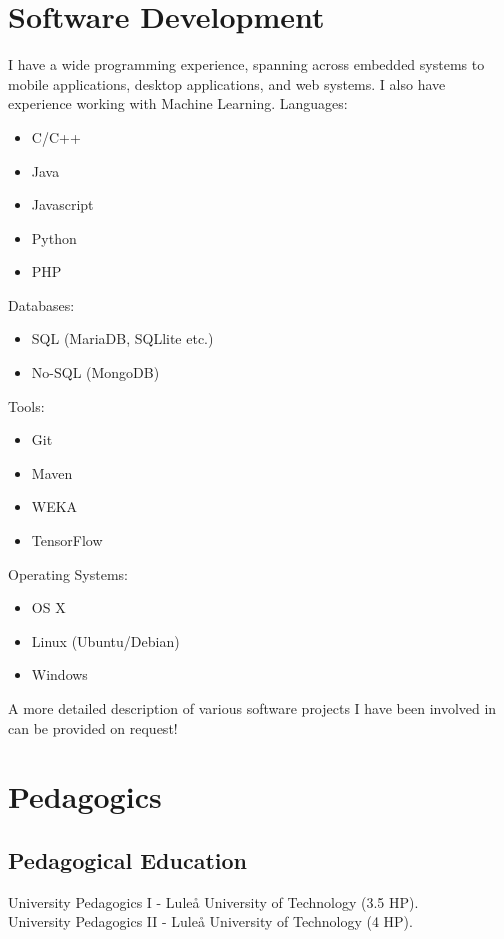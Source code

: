 \documentclass{article}
\begin{document}
\section{Software Development}
I have a wide programming experience, spanning across embedded systems to mobile applications, desktop applications, and web systems. I also have experience working with Machine Learning.
\newline
\newline
Languages:
\begin{itemize}
    \item C/C++
    \item Java
    \item Javascript
    \item Python
    \item PHP
\end{itemize}
\newline
Databases:
\begin{itemize}
    \item SQL (MariaDB, SQLlite etc.)
    \item No-SQL (MongoDB)
\end{itemize}
\newline
Tools:
\begin{itemize}
    \item Git
    \item Maven
    \item WEKA
    \item TensorFlow
\end{itemize}
\newline
Operating Systems:
\begin{itemize}
    \item OS X
    \item Linux (Ubuntu/Debian)
    \item Windows
\end{itemize}

A more detailed description of various software projects I have been involved in can be provided on request!

\newpage
\section{Pedagogics}
\subsection{Pedagogical Education}
University Pedagogics I - Luleå University of Technology (3.5 HP).\\
University Pedagogics II - Luleå University of Technology (4 HP).
\end{document}
